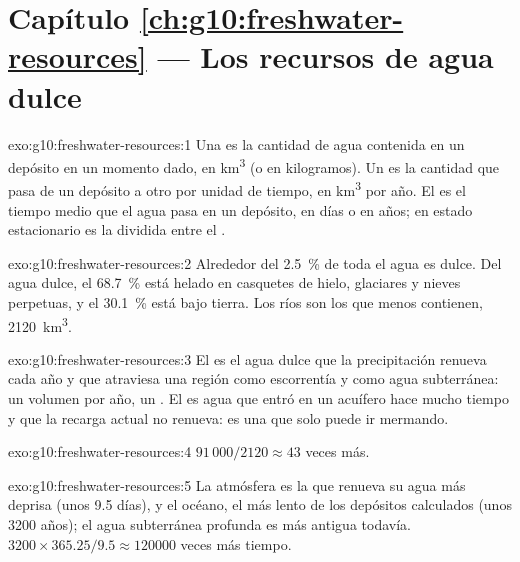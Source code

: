 \section*{Capítulo \ref{ch:g10:freshwater-resources} --- Los recursos de agua dulce}

\begin{solution}{exo:g10:freshwater-resources:1}
Una  es la cantidad de agua contenida en un depósito en un momento
dado, en \unit{km^3} (o en kilogramos). Un  es la cantidad que pasa de un
depósito a otro por unidad de tiempo, en \unit{km^3} por año. El  es el tiempo medio que el agua pasa en un depósito, en días o en
años; en estado estacionario es la  dividida entre el .
\end{solution}

\begin{solution}{exo:g10:freshwater-resources:2}
Alrededor del \qty{2.5}{\percent} de toda el agua es dulce. Del agua dulce,
el \qty{68.7}{\percent} está helado en casquetes de hielo, glaciares y nieves
perpetuas, y el \qty{30.1}{\percent} está bajo tierra. Los ríos son los que
menos contienen, \num{2120}~\unit{km^3}.
\end{solution}

\begin{solution}{exo:g10:freshwater-resources:3}
El  es el agua dulce que la precipitación renueva cada
año y que atraviesa una región como escorrentía y como agua subterránea: un
volumen por año, un . El  es agua que entró en un
acuífero hace mucho tiempo y que la recarga actual no renueva: es una
 que solo puede ir mermando.
\end{solution}

\begin{solution}{exo:g10:freshwater-resources:4}
$91\,000/2120 \approx 43$ veces más.
\end{solution}

\begin{solution}{exo:g10:freshwater-resources:5}
La atmósfera es la que renueva su agua más deprisa (unos \num{9.5} días), y
el océano, el más lento de los depósitos calculados (unos \num{3200} años);
el agua subterránea profunda es más antigua todavía. $3200 \times 365.25/9.5 \approx \num{120000}$ veces más tiempo.
\end{solution}

